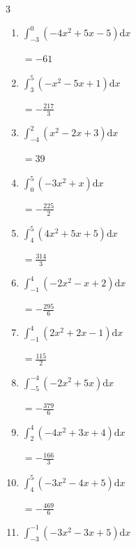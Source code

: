 \begin{multicols}{3}
\begin{enumerate}
  \item $\displaystyle \int_{-3}^{0}\left( -4x^{2}+5x-5 \right) \mathrm{d}x$

        $\displaystyle =-61$

  \item $\displaystyle \int_{3}^{5}\left( -x^{2}-5x+1 \right) \mathrm{d}x$

        $\displaystyle =-\frac{217}{3}$

  \item $\displaystyle \int_{-4}^{2}\left( x^{2}-2x+3 \right) \mathrm{d}x$

        $\displaystyle =39$

  \item $\displaystyle \int_{0}^{5}\left( -3x^{2}+x \right) \mathrm{d}x$

        $\displaystyle =-\frac{225}{2}$

  \item $\displaystyle \int_{4}^{5}\left( 4x^{2}+5x+5 \right) \mathrm{d}x$

        $\displaystyle =\frac{314}{3}$

\columnbreak %

\resetques

  \item $\displaystyle \int_{-1}^{4}\left( -2x^{2}-x+2 \right) \mathrm{d}x$

        $\displaystyle =-\frac{295}{6}$

  \item $\displaystyle \int_{-1}^{4}\left( 2x^{2}+2x-1 \right) \mathrm{d}x$

        $\displaystyle =\frac{115}{2}$

  \item $\displaystyle \int_{-5}^{-4}\left( -2x^{2}+5x \right) \mathrm{d}x$

        $\displaystyle =-\frac{379}{6}$

  \item $\displaystyle \int_{2}^{4}\left( -4x^{2}+3x+4 \right) \mathrm{d}x$

        $\displaystyle =-\frac{166}{3}$

  \item $\displaystyle \int_{4}^{5}\left( -3x^{2}-4x+5 \right) \mathrm{d}x$

        $\displaystyle =-\frac{469}{6}$

\columnbreak %

  \item $\displaystyle \int_{-3}^{-1}\left( -3x^{2}-3x+5 \right) \mathrm{d}x$


\end{enumerate}
\end{multicols}
